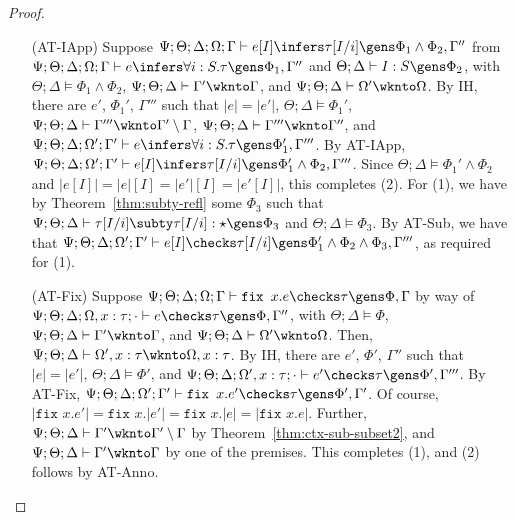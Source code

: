 \begin{proof}
\begin{itemize}
  \item[(AT-IApp)] Suppose $\Psi ; \Theta ; \Delta ; \Omega ; \Gamma \vdash e [I] \infers \tau[I/i] \gens \Phi_1 \wedge \Phi_2,\Gamma''$
  from $\Psi ; \Theta ; \Delta ; \Omega ; \Gamma \vdash e \infers \forall i : S.\tau \gens \Phi_1,\Gamma''$ and
  $\Theta ; \Delta \vdash I : S \gens \Phi_2$, with
  $\Theta ; \Delta \vDash \Phi_1 \wedge \Phi_2$,
  $\Psi ; \Theta ; \Delta \vdash \Gamma' \wknto \Gamma$, and
  $\Psi ; \Theta ; \Delta \vdash \Omega' \wknto \Omega$.
  By IH, there are $e'$, $\Phi_1'$, $\Gamma'''$ such that
  $|e| = |e'|$,
  $\Theta ; \Delta \vDash \Phi_1'$,
  $\Psi ; \Theta ; \Delta \vdash \Gamma''' \wknto \Gamma' \setminus \Gamma$,
  $\Psi ; \Theta ; \Delta \vdash \Gamma''' \wknto \Gamma''$, and
  $\Psi ; \Theta ; \Delta ; \Omega' ; \Gamma' \vdash e \infers \forall i : S. \tau \gens \Phi_1',\Gamma'''$.
  By AT-IApp,
  $\Psi ; \Theta ; \Delta ; \Omega' ; \Gamma' \vdash e [I] \infers \tau[I/i] \gens \Phi_1' \wedge \Phi_2,\Gamma'''$.
  Since $\Theta ; \Delta \vDash \Phi_1' \wedge \Phi_2$ and $|e[I]| = |e|[I] = |e'|[I] = |e'[I]|$, this completes (2).
  For (1), we have by Theorem~\ref{thm:subty-refl} some $\Phi_3$ such that $\Psi ; \Theta ; \Delta \vdash \tau[I/i] \subty \tau[I/i] : \star \gens \Phi_3$
  and $\Theta ; \Delta \vDash \Phi_3$.
  By AT-Sub, we  have that $\Psi ; \Theta ; \Delta ; \Omega' ; \Gamma' \vdash e [I] \checks \tau[I/i] \gens \Phi_1' \wedge \Phi_2 \wedge \Phi_3,\Gamma'''$,
  as required for (1).
  
  \item[(AT-Fix)] Suppose $\Psi ; \Theta ; \Delta ; \Omega ; \Gamma \vdash \texttt{fix } x.e \checks \tau \gens \Phi,\Gamma$
  by way of $\Psi ; \Theta ; \Delta ; \Omega, x : \tau ; \cdot \vdash e \checks \tau \gens \Phi,\Gamma''$, with
  $\Theta ; \Delta \vDash \Phi$,
  $\Psi ; \Theta ; \Delta \vdash \Gamma' \wknto \Gamma$, and
  $\Psi ; \Theta ; \Delta \vdash \Omega' \wknto \Omega$. Then,
  $\Psi ; \Theta ; \Delta \vdash \Omega', x : \tau \wknto \Omega, x : \tau$.
  By IH, there are $e'$, $\Phi'$, $\Gamma''$ such that
  $|e| = |e'|$,
  $\Theta ; \Delta \vDash \Phi'$, and
  $\Psi ; \Theta ; \Delta ; \Omega', x : \tau ; \cdot \vdash e' \checks \tau \gens \Phi',\Gamma'''$.
  By AT-Fix,
  $\Psi ; \Theta ; \Delta ; \Omega' ; \Gamma' \vdash \texttt{fix } x.e' \checks \tau \gens \Phi',\Gamma'$.
  Of course, $|\texttt{fix }x.e'| = \texttt{fix }x.|e'| = \texttt{fix }x.|e| = |\texttt{fix }x.e|$.
  Further, $\Psi ; \Theta ; \Delta \vdash \Gamma' \wknto \Gamma' \setminus \Gamma$
  by Theorem~\ref{thm:ctx-sub-subset2}, and $\Psi ; \Theta ; \Delta \vdash \Gamma' \wknto \Gamma$ by one of the premises.
  This completes (1), and (2) follows by AT-Anno.
  

\end{itemize}
\end{proof}
